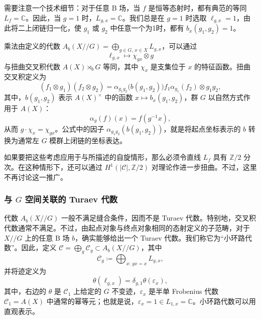 需要注意一个技术细节：对于任意 B 场，当 $f$ 是恒等态射时，都有典范的等同 $L_f=\mathbb{C}$。因此，当 $g=1$ 时，$L_{g,x}=\mathbb{C}$。我们总是在 $g=1$ 时选取 $\ell_{g,x}=1$，由此将二上闭链归一化，使 $g_1$ 或 $g_2$ 中任意一个为1时，都有 $b_x(g_1,g_2)=1$。

乘法由定义的代数 $A_b(X//G)=\bigoplus_{g\in G,\,x\in X}L_{g,x}$，可以通过
\[
\ell_{g,x}\longmapsto\chi_{gx}\otimes g
\]
与扭曲交叉积代数 $A(X)\rtimes_bG$ 等同，其中 $\chi_x$ 是支集位于 $x$ 的特征函数。扭曲交叉积定义为
\begin{equation}\label{eq:2.91}
(f_1\otimes g_1)(f_2\otimes g_2)
=\alpha_{g_1g_2}\bigl(b(g_1,g_2)\bigr)f_1\alpha_{g_1}(f_2)\otimes g_1g_2,
\end{equation}
其中，$b(g_1,g_2)$ 表示 $A(X)^{\times}$ 中的函数 $x\mapsto b_x(g_1,g_2)$，群 $G$ 以自然方式作用于 $A(X)$：
\[
\alpha_g(f)(x)=f(g^{-1}x),
\]
从而 $g\cdot\chi_x=\chi_{gx}$。公式中的因子 $\alpha_{g_1g_2}(b(g_1,g_2))$，就是将起点坐标表示的 $b$ 转换为通常左 $G$ 模群上闭链的坐标表达。

如果要把这些考虑应用于与所描述的自旋情形，那么必须令直线 $L_f$ 具有 $\mathbb{Z}/2$ 分次。在这种情形下，还可以通过 $H^1(|\mathcal{C}|,\mathbb{Z}/2)$ 对理论作进一步扭曲。不过，这里不再讨论这一推广。

\subsubsection{与 \texorpdfstring{$G$}{G} 空间关联的 Turaev 代数}\label{sec:2.6.3.2}

代数 $A_b(X//G)$ 一般不满足缝合条件，因而不是 Turaev 代数。特别地，交叉积代数通常不满足。不过，由起点对象与终点对象相同的态射定义的子范畴，对于 $X//G$ 上的任意 B 场 $b$，确实能够给出一个 Turaev 代数。我们称它为“小环路代数”。因此，定义 $\mathcal{C}=\bigoplus_g\mathcal{C}_g\subset A_b(X//G)$，其中
\begin{equation}\label{eq:2.92}
\mathcal{C}_g\coloneqq\bigoplus_{x:\,gx=x}L_{g,x},
\end{equation}
并将迹定义为
\begin{equation}\label{eq:2.93}
\theta(\ell_{g,x})=\delta_{g,1}\theta(\varepsilon_x),
\end{equation}
其中，右边的 $\theta$ 是 $\mathcal{C}_1$ 上给定的 $G$ 不变迹，$\varepsilon_x$ 是半单 Frobenius 代数 $\mathcal{C}_1=A(X)$ 中通常的幂等元；也就是说，$\varepsilon_x=1\in L_{1,x}=\mathbb{C}$。小环路代数可以用直观表示。

